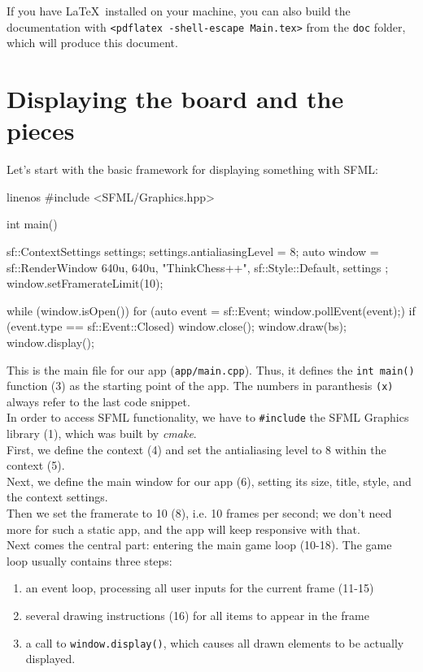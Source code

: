 If you have \LaTeX\ installed on your machine, you can also build the documentation
with \texttt{<pdflatex -shell-escape Main.tex>} from the \texttt{doc} folder,
which will produce this document.

\section{Displaying the board and the pieces}

Let's start with the basic framework for displaying something with SFML:

\begin{cpp*}{linenos}
#include <SFML/Graphics.hpp>

int main() {
  sf::ContextSettings settings;
  settings.antialiasingLevel = 8;
  auto window = sf::RenderWindow{ {640u, 640u}, "ThinkChess++",
              sf::Style::Default, settings };
  window.setFramerateLimit(10);

  while (window.isOpen()) {
    for (auto event = sf::Event{}; window.pollEvent(event);) {
      if (event.type == sf::Event::Closed) {
        window.close();
      }
    }
    window.draw(bs);
    window.display();
  }
}
\end{cpp*}

This is the main file for our app (\texttt{app/main.cpp}).
Thus, it defines the \texttt{int main()} function (3) as the starting point of the app.
The numbers in paranthesis \texttt{(x)} always refer to the last code snippet.\\
In order to access SFML functionality, we have to \texttt{#include} the SFML Graphics
library (1), which was built by \emph{cmake}.\\
First, we define the context (4) and set the antialiasing level to 8 within the context (5).\\
Next, we define the main window for our app (6), setting its size, title, style, and the context
settings.\\
Then we set the framerate to 10 (8), i.e. 10 frames per second; we don't need more
for such a static app, and the app will keep responsive with that.\\
Next comes the central part: entering the main game loop (10-18). The game loop usually contains
three steps:

\begin{enumerate}
  \item an event loop, processing all user inputs for the current frame (11-15)
  \item several drawing instructions (16) for all items to appear in the frame
  \item a call to \texttt{window.display()}, which causes all drawn elements to be
    actually displayed.
\end{enumerate}

